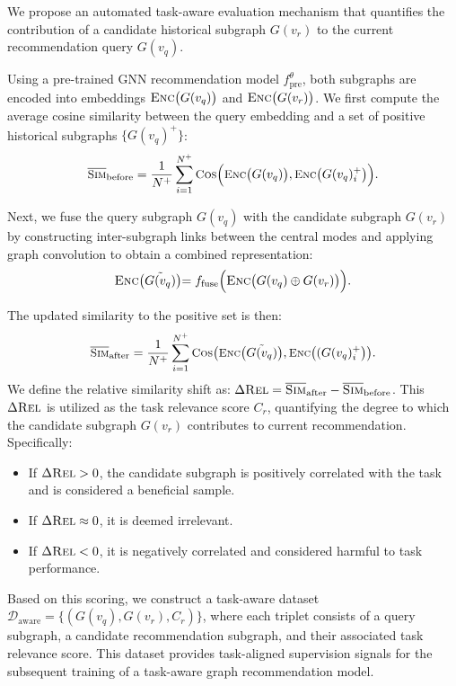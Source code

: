 \documentclass[letterpaper]{article} %
\begin{document}
We propose an automated task-aware evaluation mechanism that quantifies the contribution of a candidate historical subgraph $G(v_r)$ to the current recommendation query $G(v_q)$. 

Using a pre-trained GNN recommendation model $f^{\theta}_{\text{pre}}$, both subgraphs are encoded into embeddings $\textsc{Enc}\bigl(G(v_q)\bigl)$ and $\textsc{Enc}\bigl(G(v_r)\bigl)$. We first compute the average cosine similarity between the query embedding and a set of positive historical subgraphs $\{ G(v_q)^+ \}$:
\begin{equation}
\small
\overline{\textsc{Sim}}_{\text{before}} = \frac{1}{N^+} \sum_{i=1}^{N^+} \textsc{Cos}\Bigl(\textsc{Enc}\bigl(G(v_q)\bigl), \textsc{Enc}\bigl(G(v_q)^+_i\bigl)\Bigr).
\end{equation}

Next, we fuse the query subgraph $G(v_q)$ with the candidate subgraph $G(v_r)$ by constructing inter-subgraph links between the central modes and applying graph convolution to obtain a combined representation:
\begin{equation}
\textsc{Enc}\bigl(\tilde{G(v_q)}\bigl) = f_{\text{fuse}}\Bigl(\textsc{Enc}\bigl(G(v_q)\oplus G(v_r)\bigl)\Bigl).
\end{equation}

The updated similarity to the positive set is then:
\begin{equation}
\small
\overline{\textsc{Sim}}_{\text{after}} = \frac{1}{N^+} \sum_{i=1}^{N^+} \textsc{Cos}\bigl(\textsc{Enc}\bigl(\tilde{G(v_q)}\bigl), \textsc{Enc}\bigl((G(v_q)^+_i\bigl)\bigr).
\end{equation}
We define the relative similarity shift as: $\Delta \textsc{Rel} = \overline{\textsc{Sim}}_{\text{after}} - \overline{\textsc{Sim}}_{\text{before}}$. This $\Delta \textsc{Rel}$ is utilized as the task relevance score $C_r$, quantifying the degree to which the candidate subgraph $G(v_r)$ contributes to current recommendation. Specifically:
\begin{itemize}
    \item If $\Delta \textsc{Rel} > 0$, the candidate subgraph is positively correlated with the task and is considered a {beneficial} sample.
    \item If $\Delta \textsc{Rel} \approx 0$, it is deemed {irrelevant}.
    \item If $\Delta \textsc{Rel} < 0$, it is {negatively correlated} and considered {harmful} to task performance.
\end{itemize}
Based on this scoring, we construct a task-aware dataset $\mathcal{D}_{\text{aware}} = \{(G(v_q), G(v_r), C_r)\}$, where each triplet consists of a query subgraph, a candidate recommendation subgraph, and their associated task relevance score. This dataset provides task-aligned supervision signals for the subsequent training of a task-aware graph recommendation model.
\end{document}
